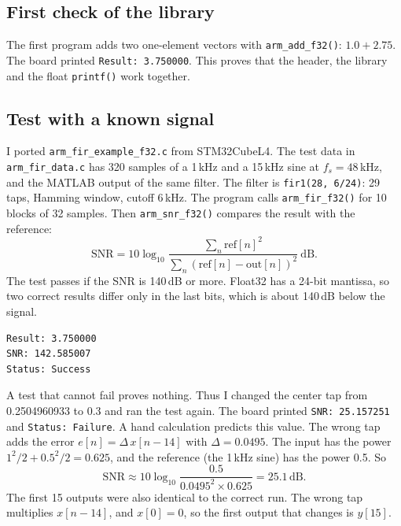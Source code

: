 \documentclass[11pt,a4paper]{article}
\begin{document}
\subsection{First check of the library}

The first program adds two one-element vectors with \texttt{arm\_add\_f32()}:
$1.0 + 2.75$. The board printed \texttt{Result: 3.750000}. This proves that the
header, the library and the float \texttt{printf()} work together.

\subsection{Test with a known signal}

I ported \texttt{arm\_fir\_example\_f32.c} from STM32CubeL4. The test data in
\texttt{arm\_fir\_data.c} has 320 samples of a 1\,kHz and a 15\,kHz sine at
$f_s = 48$\,kHz, and the MATLAB output of the same filter. The filter is
\texttt{fir1(28, 6/24)}: 29 taps, Hamming window, cutoff 6\,kHz. The program
calls \texttt{arm\_fir\_f32()} for 10 blocks of 32 samples. Then
\texttt{arm\_snr\_f32()} compares the result with the reference:
\begin{equation}
  \text{SNR} = 10 \log_{10}
     \frac{\sum_n \text{ref}[n]^2}{\sum_n (\text{ref}[n]-\text{out}[n])^2}\ \text{dB}.
\end{equation}
The test passes if the SNR is 140\,dB or more. Float32 has a 24-bit mantissa,
so two correct results differ only in the last bits, which is about
140\,dB below the signal.

\begin{lstlisting}[style=plain,caption={Serial output of the known-signal test.}]
Result: 3.750000
SNR: 142.585007
Status: Success
\end{lstlisting}

A test that cannot fail proves nothing. Thus I changed the center tap from
0.2504960933 to 0.3 and ran the test again. The board printed
\texttt{SNR: 25.157251} and \texttt{Status: Failure}. A hand calculation
predicts this value. The wrong tap adds the error
$e[n] = \Delta\, x[n-14]$ with $\Delta = 0.0495$. The input has the power
$1^2/2 + 0.5^2/2 = 0.625$, and the reference (the 1\,kHz sine) has the power
0.5. So
\begin{equation}
  \text{SNR} \approx 10 \log_{10} \frac{0.5}{0.0495^2 \times 0.625}
           = 25.1\,\text{dB}.
\end{equation}
The first 15 outputs were also identical to the correct run. The wrong tap
multiplies $x[n-14]$, and $x[0] = 0$, so the first output that changes is
$y[15]$.
\end{document}
